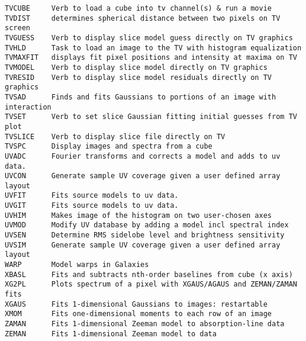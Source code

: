 \begin{verbatim}
TVCUBE     Verb to load a cube into tv channel(s) & run a movie
TVDIST     determines spherical distance between two pixels on TV screen
TVGUESS    Verb to display slice model guess directly on TV graphics
TVHLD      Task to load an image to the TV with histogram equalization
TVMAXFIT   displays fit pixel positions and intensity at maxima on TV
TVMODEL    Verb to display slice model directly on TV graphics
TVRESID    Verb to display slice model residuals directly on TV graphics
TVSAD      Finds and fits Gaussians to portions of an image with interaction
TVSET      Verb to set slice Gaussian fitting initial guesses from TV plot
TVSLICE    Verb to display slice file directly on TV
TVSPC      Display images and spectra from a cube
UVADC      Fourier transforms and corrects a model and adds to uv data.
UVCON      Generate sample UV coverage given a user defined array layout
UVFIT      Fits source models to uv data.
UVGIT      Fits source models to uv data.
UVHIM      Makes image of the histogram on two user-chosen axes
UVMOD      Modify UV database by adding a model incl spectral index
UVSEN      Determine RMS sidelobe level and brightness sensitivity
UVSIM      Generate sample UV coverage given a user defined array layout
WARP       Model warps in Galaxies
XBASL      Fits and subtracts nth-order baselines from cube (x axis)
XG2PL      Plots spectrum of a pixel with XGAUS/AGAUS and ZEMAN/ZAMAN fits
XGAUS      Fits 1-dimensional Gaussians to images: restartable
XMOM       Fits one-dimensional moments to each row of an image
ZAMAN      Fits 1-dimensional Zeeman model to absorption-line data
ZEMAN      Fits 1-dimensional Zeeman model to data
\end{verbatim}\eve

\vfill\eject
{}

